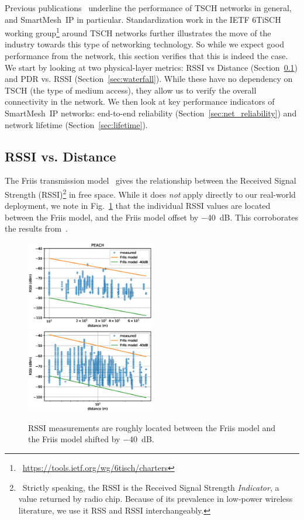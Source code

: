 \documentclass{elsarticle}
\newcommand{\smip}                {SmartMesh~IP\xspace}
\begin{document}
Previous publications~\cite{watteyne16peach,watteyne10mitigating,watteyne09reliability,watteyne15industrial} underline the performance of TSCH networks in general, and \smip in particular.
Standardization work in the IETF 6TiSCH working group\footnote{~\url{https://tools.ietf.org/wg/6tisch/charters}} around TSCH networks further illustrates the move of the industry towards this type of networking technology.
So while we expect good performance from the network, this section verifies that this is indeed the case.
We start by looking at two physical-layer metrics: RSSI vs Distance (Section~\ref{sec:rssi_distance}) and PDR vs. RSSI (Section~\ref{sec:waterfall}).
While these have no dependency on TSCH (the type of medium access), they allow us to verify the overall connectivity in the network.
We then look at key performance indicators of \smip networks: end-to-end reliability (Section~\ref{sec:net_reliability}) and network lifetime (Section~\ref{sec:lifetime}).

\subsection{RSSI vs. Distance}
\label{sec:rssi_distance}

The Friis transmission model~\cite{saunders07antennas} gives the relationship between the Received Signal Strength (RSSI)\footnote{~Strictly speaking, the RSSI is the Received Signal Strength \textit{Indicator}, a value returned by radio chip. Because of its prevalence in low-power wireless literature, we use it RSS and RSSI interchangeably.} in free space.
While it does \textit{not} apply directly to our real-world deployment, we note in Fig.~\ref{fig:pister_hack} that the individual RSSI values are located between the Friis model, and the Friis model offset by $-$40~dB.
This corroborates the results from~\cite{zats10wireless}.

\begin{figure}[h]
    \includegraphics[width=0.5\textwidth]{pister_hack_peach.eps}
    \includegraphics[width=0.5\textwidth]{pister_hack.eps}
    \caption{RSSI measurements are roughly located between the Friis model and the Friis model shifted by $-$40~dB.}
    \label{fig:pister_hack}
\end{figure}
\end{document}
